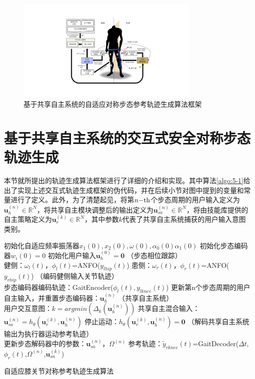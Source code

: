 \begin{figure}[!t]
  \centering\includegraphics[width=0.8\textwidth]{figures/5-Fig-2.pdf}
  \caption{基于共享自主系统的自适应对称步态参考轨迹生成算法框架}
  \label{fig:5-2}
\end{figure}

\section{基于共享自主系统的交互式安全对称步态轨迹生成}
本节就所提出的轨迹生成算法框架进行了详细的介绍和实现。其中算法\ref{algo:5-1}给出了实现上述交互式轨迹生成框架的伪代码，并在后续小节对图中提到的变量和常量进行了定义。此外，为了清楚起见，将第$n{\rm{ - th}}$个步态周期的用户输入定义为${\pmb{u}}_h^{(n)} \in {\mathbb{R}^N}$，将共享自主模块调整后的输出定义为${\pmb{u}}_{sa}^{(n)} \in {\mathbb{R}^N}$，将由技能库提供的自主策略定义为${\pmb{u}}_r^{(k)} \in {\mathbb{R}^N}$，其中参数$k$代表了共享自主系统捕获的用户输入意图类别。
\begin{algorithm}[h]
  \SetAlgoLined
  初始化自适应频率振荡器$x_1(0),x_2(0),\omega(0),\alpha_0(0)\alpha_1(0)$\;
  初始化步态编码器$w_i(0)=0$\;
  初始化用户输入$\pmb{u}_h^{(0)}=\pmb{0}$\;
  {
    （步态相位跟踪）\\
    健侧：$\omega_l(t)$，$\phi_l(t)$=ANFO($y_{lhip}(t)$) \;
    患侧：$\omega_r(t)$，$\phi_r(t)$=ANFO($y_{rhip}(t)$) \;
    （编码健侧输入关节轨迹）\\
    {
      步态编码器编码轨迹：GaitEncoder($\phi_l(t),y_{lknee}(t)$) \;
    }
    {
      更新第n个步态周期的用户自主输入，并重置步态编码器：$\pmb{u}_h^{(n)}$ 
    }
    （共享自主系统）\\
    {
      {
        用户交互意图：$k=argmin(\Delta_k(\pmb{u}_h^{(n)}))$ \;
        共享自主混合输入：$\pmb{u}_{sa}^{(n)} = h_{\theta}(\pmb{u}_r^{(k)}, \pmb{u}_h^{(n)})$\;
      }
    }
    {
      停止运动：$h_{\theta}(\pmb{u}_r^{(k)}, \pmb{u}_h^{(n)})=\pmb{0}$
    }
    （解码共享自主系统输出为执行器运动参考轨迹）\\
    {
      更新步态解码器中的参数：$\pmb{u}_{sa}^{(n)}$，$\Omega^{(n)}$\;
    }
    {
      参考轨迹：$\widetilde{y}_{rknee}(t)$=GaitDecoder($\Delta t$, $\phi_r(t)$,$\Omega^{(n)}$,$\pmb{u}_{sa}^{(k)}$) \;
    }
  }
  \caption{自适应膝关节对称参考轨迹生成算法}
  \label{algo:5-1}
\end{algorithm}  

